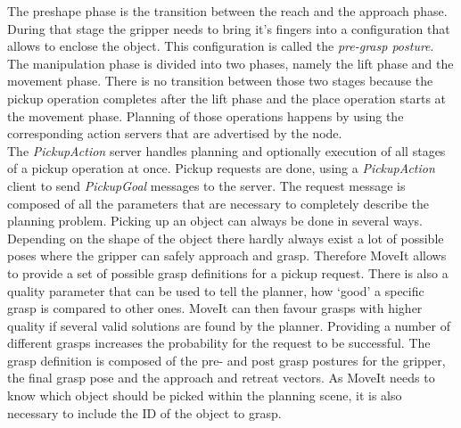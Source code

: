 The preshape phase is the transition between the reach and the approach phase. During that stage the gripper needs to  bring it's fingers into a configuration that allows to enclose the object. This configuration is called the \emph{pre-grasp posture}. The manipulation phase is divided into two phases, namely the lift phase and the movement phase. There is no transition between those two stages because the pickup operation completes after the lift phase and the place operation starts at the movement phase. Planning of those operations happens by using the corresponding action servers that are advertised by the  node.\\

The \emph{PickupAction} server handles planning and optionally execution of all stages of a pickup operation at once. Pickup requests are done, using a \emph{PickupAction} client to send \emph{PickupGoal} messages to the server. The request message is composed of all the parameters that are necessary to completely describe the planning problem. Picking up an object can always be done in several ways. Depending on the shape of the object there hardly always exist a lot of possible poses where the gripper can safely approach and grasp. Therefore MoveIt allows to provide a set of possible grasp definitions for a pickup request. There is also a quality parameter that can be used to tell the planner, how `good' a specific grasp is compared to other ones. MoveIt can then favour grasps with higher quality if several valid solutions are found by the planner. Providing a number of different grasps increases the probability for the request to be successful. The grasp definition is composed of the pre- and post grasp postures for the gripper, the final grasp pose and the approach and retreat vectors. As MoveIt needs to know which object should be picked within the planning scene, it is also necessary to include the ID of the object to grasp.\\



